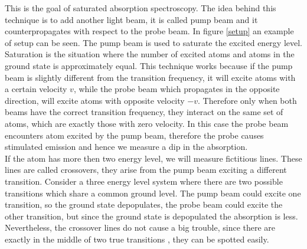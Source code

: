 \documentclass[a4paper,10pt]{article}
\begin{document}
This is the goal of saturated absorption spectroscopy. The idea behind this technique is to add another light beam, it is called pump beam and it counterpropagates with respect to the probe beam. In figure \ref{setup} an example of setup can be seen. The pump beam is used to saturate the excited energy level. Saturation is the situation where the number of excited atoms and atoms in the ground state is approximately equal. This technique works because if the pump beam is slightly different from the transition frequency, it will excite atoms with a certain velocity $v$, while the probe beam which propagates in the opposite direction, will excite atoms with opposite velocity $-v$. Therefore only when both beams have the correct transition frequency, they interact on the same set of atoms, which are exactly those with zero velocity. In this case the probe beam encounters atom excited by the pump beam, therefore the probe causes stimulated emission and hence we measure a dip in the absorption.\\
If the atom has more then two energy level, we will measure fictitious lines. These lines are called crossovers, they arise from the pump beam exciting a different transition. Consider a three energy level system where there are two possible transitions which share a common ground level. The pump beam could excite one transition, so the ground state depopulates, the probe beam could excite the other transition, but since the ground state is depopulated the absorption is less. Nevertheless, the crossover lines do not cause a big trouble, since there are exactly in the middle of two true transitions \cite{crossover}, they can be spotted easily.
\end{document}
